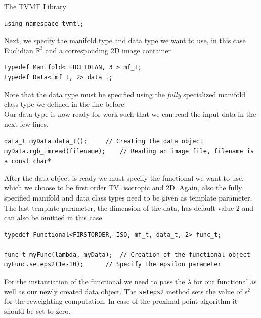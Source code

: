 \begin{chapter}{The TVMT Library}
\begin{lstlisting}[label=code:tut_include,caption={Inclusion of library headers}]
using namespace tvmtl;
\end{lstlisting}

Next, we specify the manifold type and data type we want to use, in this case Euclidian $\mathbb{R}^3$ and a corresponding 2D image container\\

\cppinline
\begin{lstlisting}[label=code:tut_typedef,caption={Specification of manifold and data type}]
typedef Manifold< EUCLIDIAN, 3 > mf_t;
typedef Data< mf_t, 2> data_t;
\end{lstlisting}

Note that the data type must be specified using the \textit{fully} specialized manifold class type we defined in the line before.\\
Our data type is now ready for work such that we can read the input data in the next few lines.\\

\cppinline
\begin{lstlisting}[label=code:tut_data,caption={Initialization and input of image data}]
data_t myData=data_t();		// Creating the data object
myData.rgb_imread(filename);	// Reading an image file, filename is a const char*
\end{lstlisting}

After the data object is ready we must specify the functional we want to use, which we choose to be first order TV, isotropic and 2D. Again,
also the fully specified manifold and data class types need to be given as template parameter. The last template parameter, the dimension of the data, 
has default value $2$ and can also be omitted in this case.\\

\cppinline
\begin{lstlisting}[label=code:tut_func,caption={Defining the functional and setting parameters}]
typedef Functional<FIRSTORDER, ISO, mf_t, data_t, 2> func_t;

func_t myFunc(lambda, myData);  // Creation of the functional object
myFunc.seteps2(1e-10);		// Specify the epsilon parameter 
\end{lstlisting}

For the instantiation of the functional we need to pass the $\lambda$ for our functional as well as our newly created data object. The \texttt{seteps2} method
sets the value of $\epsilon^2$ for the reweighting computation. In case of the proximal point algorithm it should be set to zero.\\


\end{chapter}
